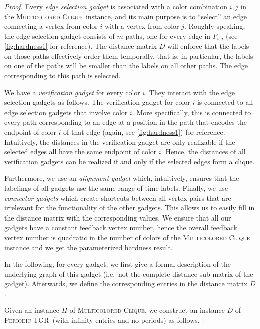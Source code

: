\documentclass[a4paper,UKenglish,cleveref, autoref, thm-restate]{lipics-v2021}
\newcommand{\deltaExact}{\textsc{Periodic TGR}}
\begin{document}
\begin{proof}
Every \emph{edge selection gadget} is associated with a color combination $i,j$ in the \textsc{Multicolored Clique} instance, and its main purpose is to ``select'' an edge connecting a vertex from color $i$ with a vertex from color $j$.
Roughly speaking, the edge selection gadget consists of $m$ paths, one for every edge in $F_{i,j}$ (see \cref{fig:hardness1} for reference). The distance matrix $D$ will enforce that the labels on those paths effectively order them temporally, that is, in particular, the labels on one of the paths will be smaller than the labels on all other paths. The edge corresponding to this path is selected.


 We have a \emph{verification gadget} for every color $i$. They interact with the edge selection gadgets as follows.
 The verification gadget for color $i$ is connected to all edge selection gadgets that involve color $i$. More specifically, this is connected to every path corresponding to an edge at a position in the path that encodes the endpoint of color $i$ of that edge (again, see \cref{fig:hardness1}) for reference. Intuitively, the distances in the verification gadget are only realizable if the selected edges all have the same endpoint of color $i$.
Hence, the distances of all verification gadgets can be realized if and only if the selected edges form a clique. 

Furthermore, we use an \emph{alignment gadget} which, intuitively, ensures that the labelings of all gadgets use the same range of time labels. Finally, we use \emph{connector gadgets} which create shortcuts between all vertex pairs that are irrelevant for the functionality of the other gadgets. This allows us to easily fill in the distance matrix with the corresponding values.
We ensure that all our gadgets have a constant feedback vertex number, hence the overall feedback vertex number is quadratic in the number of colors of the \textsc{Multicolored Clique} instance and we get the parameterized hardness result.

In the following, for every gadget, we first give a formal description of the underlying graph of this gadget (i.e.~not the complete distance sub-matrix of the gadget). Afterwards, we define the corresponding entries in the distance matrix $D$.

    Given an instance $H$ of \textsc{Multicolored Clique}, we construct an instance $D$ of \deltaExact\ (with infinity entries and no periods) as follows. 
    

\end{proof}
\end{document}
